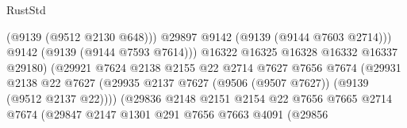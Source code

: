 \begin{lexlean}{RustStd}
\begin{coremodule}
                                                    (@9139 (@9512 @2130 @648)))
                                                  @29897
                                                  @9142
                                                  (@9139 (@9144 @7603 @2714)))
                                                @9142
                                                (@9139 (@9144 @7593 @7614)))
                                              @16322
                                              @16325
                                              @16328
                                              @16332
                                              @16337
                                              @29180)
                                            (@29921
                                              @7624
                                              @2138
                                              @2155
                                              @22
                                              @2714
                                              @7627
                                              @7656
                                              @7674
                                              (@29931
                                                @2138
                                                @22
                                                @7627
                                                (@29935
                                                  @2137
                                                  @7627
                                                  (@9506 (@9507 @7627))
                                                  (@9139 (@9512 @2137 @22))))
                                              (@29836
                                                @2148
                                                @2151
                                                @2154
                                                @22
                                                @7656
                                                @7665
                                                @2714
                                                @7674
                                                (@29847
                                                  @2147
                                                  @1301
                                                  @291
                                                  @7656
                                                  @7663
                                                  @4091
                                                  (@29856

\end{coremodule}
\end{lexlean}
